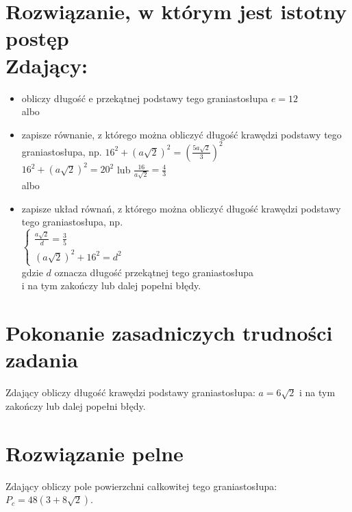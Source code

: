 \documentclass[10pt]{article}
\begin{document}
\section*{Rozwiązanie, w którym jest istotny postęp \\
 Zdający:}
\begin{itemize}
  \item obliczy długość e przekątnej podstawy tego graniastosłupa $e=12$\\
albo
  \item zapisze równanie, z którego można obliczyć długość krawędzi podstawy tego graniastosłupa, np. $16^{2}+(a \sqrt{2})^{2}=\left(\frac{5 a \sqrt{2}}{3}\right)^{2}$\\
$16^{2}+(a \sqrt{2})^{2}=20^{2}$ lub $\frac{16}{a \sqrt{2}}=\frac{4}{3}$\\
albo
  \item zapisze układ równań, z którego można obliczyć długość krawędzi podstawy tego graniastosłupa, np.\\
$\left\{\begin{array}{l}\frac{a \sqrt{2}}{d}=\frac{3}{5} \\ (a \sqrt{2})^{2}+16^{2}=d^{2}\end{array}\right.$\\
gdzie $d$ oznacza długość przekątnej tego graniastosłupa\\
i na tym zakończy lub dalej popełni błędy.
\end{itemize}

\section*{Pokonanie zasadniczych trudności zadania}
Zdający obliczy długość krawędzi podstawy graniastosłupa: $a=6 \sqrt{2}$ i na tym zakończy lub dalej popełni błędy.

\section*{Rozwiązanie pelne}
Zdający obliczy pole powierzchni całkowitej tego graniastosłupa: $P_{c}=48(3+8 \sqrt{2})$.
\end{document}

